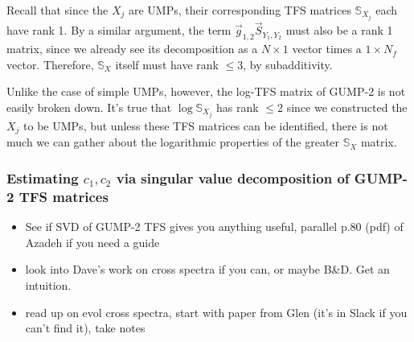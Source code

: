 \documentclass{article}
\begin{document}
Recall that since the $X_j$ are UMPs, their corresponding TFS matrices $\mathbb S_{X_j}$ each have rank 1. By a similar argument, the term  $\vec g_{1,2} \vec S_{Y_1,Y_2}$ must also be a rank 1 matrix, since we already see its decomposition as a $N\times 1$ vector times a $1 \times N_f$ vector. Therefore, $\mathbb{S}_X$ itself must have rank $\leq 3$, by subadditivity.

Unlike the case of simple UMPs, however, the log-TFS matrix of GUMP-2 is not easily broken down. It's true that $\log\mathbb{S}_{X_j}$ has rank $\leq 2$ since we constructed the $X_j$ to be UMPs, but unless these TFS matrices can be identified, there is not much we can gather about the logarithmic properties of the greater $\mathbb S_X$ matrix.   



\subsubsection{Estimating $c_1, c_2$ via singular value decomposition of GUMP-2 TFS matrices}
\begin{itemize}
    \item See if SVD of GUMP-2 TFS gives you anything useful, parallel p.80 (pdf) of Azadeh if you need a guide
    \item look into Dave's work on cross spectra if you can, or maybe B\&D. Get an intuition.
    \item read up on evol cross spectra, start with paper from Glen (it's in Slack if you can't find it), take notes
\end{itemize}

\newpage
{}
\end{document}
